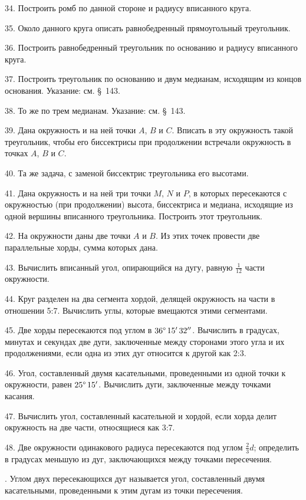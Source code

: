 \documentclass[oneside]{book}
\begin{document}
34.
Построить ромб по данной стороне и радиусу вписанного круга.

35.
Около данного круга описать равнобедренный прямоугольный треугольник.

36.
Построить равнобедренный треугольник по основанию и радиусу вписанного круга.

37.
Построить треугольник по основанию и двум медианам, исходящим из концов основания.
Указание:
см. §~143.

38.
То же по трем медианам.
Указание:
см. §~143.

39.
Дана окружность и на ней точки $A$, $B$ и $C$.
Вписать в эту окружность такой треугольник, чтобы его биссектрисы при продолжении встречали окружность в точках $A$, $B$ и $C$.

40.
Та же задача, с заменой биссектрис треугольника его высотами.

41.
Дана окружность и на ней три точки $M$, $N$ и $P$, в которых пересекаются с окружностью (при продолжении) высота, биссектриса и медиана, исходящие из одной вершины вписанного треугольника.
Построить этот треугольник.

42.
На окружности даны две точки $A$ и $B$.
Из этих точек провести две параллельные хорды, сумма которых дана.



43.
Вычислить вписанный угол, опирающийся на дугу, равную $\tfrac1{12}$ части окружности.

44.
Круг разделен на два сегмента хордой, делящей окружность на части в отношении 5:7.
Вычислить углы, которые вмещаются этими сегментами.

45.
Две хорды пересекаются под углом в $36\degree\, 15'\, 32''$.
Вычислить в градусах, минутах и секундах две дуги, заключенные между сторонами этого угла и их продолжениями, если одна из этих дуг относится к другой как 2:3.

46.
Угол, составленный двумя касательными, проведенными из одной точки к окружности, равен $25\degree\,15'$.
Вычислить дуги, заключенные между точками касания.

47.
Вычислить угол, составленный касательной и хордой, если хорда делит окружность на две части, относящиеся как 3:7.

48.
Две окружности одинакового радиуса пересекаются под углом $\tfrac23d$;
определить в градусах меньшую из дуг, заключающихся между точками пересечения.

.
Углом двух пересекающихся дуг называется угол, составленный двумя касательными, проведенными к этим дугам из точки пересечения.
\end{document}
